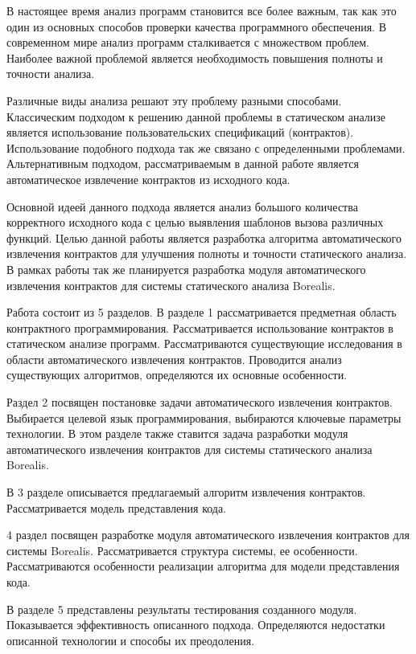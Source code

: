 \intro
В настоящее время анализ программ становится все более важным, так как это один из основных способов проверки качества программного обеспечения. В современном мире анализ программ сталкивается с множеством проблем.  Наиболее важной проблемой является необходимость повышения полноты и точности анализа.

Различные виды анализа решают эту проблему разными способами. Классическим подходом к решению данной проблемы в статическом анализе является использование пользовательских спецификаций (контрактов). Использование подобного подхода так же связано с определенными проблемами. Альтернативным подходом, рассматриваемым в данной работе является автоматическое извлечение контрактов из исходного кода.

Основной идеей данного подхода является анализ большого количества корректного исходного кода с целью выявления шаблонов вызова различных функций. Целью данной работы является разработка алгоритма автоматического извлечения контрактов для улучшения полноты и точности статического анализа. В рамках работы так же планируется разработка модуля автоматического извлечения контрактов для системы статического анализа Borealis\cite{borealis}.

Работа состоит из 5 разделов. В разделе 1 рассматривается предметная область контрактного программирования. Рассматривается использование контрактов в статическом анализе программ. Рассматриваются существующие исследования в области автоматического извлечения контрактов. Проводится анализ существующих алгоритмов, определяются их основные особенности.

Раздел 2 посвящен постановке задачи автоматического извлечения контрактов. Выбирается целевой язык программирования, выбираются ключевые параметры технологии. В этом разделе также ставится задача разработки модуля автоматического извлечения контрактов для системы статического анализа Borealis.

В 3 разделе описывается предлагаемый алгоритм извлечения контрактов. Рассматривается модель представления кода.

4 раздел посвящен разработке модуля автоматического извлечения контрактов для системы Borealis. Рассматривается структура системы, ее особенности. Рассматриваются особенности реализации алгоритма для модели представления кода.

В разделе 5 представлены результаты тестирования созданного модуля. Показывается эффективность описанного подхода. Определяются недостатки описанной технологии и способы их преодоления.
